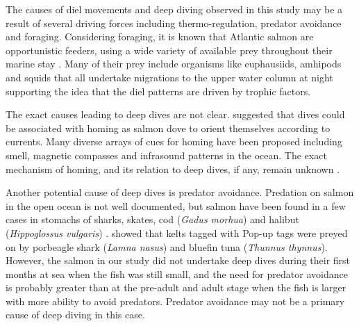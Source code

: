 The causes of diel movements and deep diving observed in this study may be a result of several driving forces including thermo-regulation, predator avoidance and foraging.
Considering foraging, it is known that Atlantic salmon are opportunistic feeders, using a wide variety of available prey throughout their marine stay \citep{Rikardsen2011}. 
Many of their prey include organisms like euphausiids, amhipods and squids that all undertake migrations to the upper water column at night \citep{Walker2000} supporting the idea that the diel patterns are driven by trophic factors. 

The exact causes leading to deep dives are not clear. \cite{Westerberg1982a,Westerberg1982b} suggested that dives could be associated with homing as salmon dove to orient themselves according to currents. Many diverse arrays of cues for homing have been proposed including smell, magnetic compasses and infrasound patterns in the ocean. The exact mechanism of homing, and its relation to deep dives, if any, remain unknown \citep{Thorstad2011}.

Another potential cause of deep dives is predator avoidance. 
Predation on salmon in the open ocean is not well documented, but salmon have been found in a few cases in stomachs of sharks, skates, cod (\textit{Gadus morhua}) and halibut (\textit{Hippoglossus vulgaris}) \citep{Ward2011}. \cite{Lacroix2014} showed that kelts tagged with Pop-up tags were preyed on by porbeagle shark (\textit{Lamna nasus}) and bluefin tuna (\textit{Thunnus thynnus}). However, the salmon in our study did not undertake deep dives during their first months at sea when the fish was still small, and the need for predator avoidance is probably greater than at the pre-adult and adult stage when the fish is larger with more ability to avoid predators. Predator avoidance may not be a primary cause of deep diving in this case.

